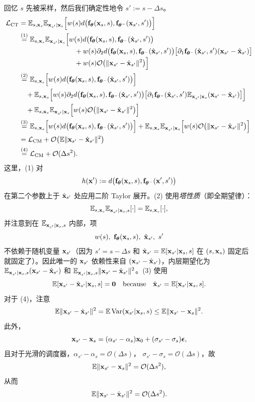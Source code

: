 回忆 $s$ 先被采样，然后我们确定性地令 $s':=s-\Delta s$。
\begin{align*}
\mathcal{L}_{\mathrm{CT}}
&= \mathbb{E}_{s,{\mathbf{x}}_s}\mathbb{E}_{{\mathbf{x}}_{s'}|{\mathbf{x}}_s} \Big[w(s) d\big({\mathbf{f}}_{{\bm{\theta}}}({\mathbf{x}}_s,s), {\mathbf{f}}_{{\bm{\theta}}^-}({\mathbf{x}}_{s'},s')\big)\Big]
\\
&\overset{\text{(1)}}{=} \mathbb{E}_{s,{\mathbf{x}}_s}\mathbb{E}_{{\mathbf{x}}_{s'}|{\mathbf{x}}_s} \Big[
w(s) d\big({\mathbf{f}}_{{\bm{\theta}}}({\mathbf{x}}_s,s), {\mathbf{f}}_{{\bm{\theta}}^-}(\hat{{\mathbf{x}}}_{s'},s')\big)
\\[-2pt]
&\qquad\qquad\qquad\qquad
+ w(s) \partial_2 d\big({\mathbf{f}}_{{\bm{\theta}}}({\mathbf{x}}_s,s),{\mathbf{f}}_{{\bm{\theta}}^-}(\hat{{\mathbf{x}}}_{s'},s')\big)\big[\partial_1{\mathbf{f}}_{{\bm{\theta}}^-}(\hat{{\mathbf{x}}}_{s'},s')({\mathbf{x}}_{s'}-\hat{{\mathbf{x}}}_{s'})\big]
\\[-2pt]
&\qquad\qquad\qquad\qquad
+ w(s) \mathcal O \big(\|{\mathbf{x}}_{s'}-\hat{{\mathbf{x}}}_{s'}\|^2\big)\Big]
\\
&\overset{\text{(2)}}{=} \mathbb{E}_{s,{\mathbf{x}}_s} \Big[w(s) d\big({\mathbf{f}}_{{\bm{\theta}}}({\mathbf{x}}_s,s), {\mathbf{f}}_{{\bm{\theta}}^-}(\hat{{\mathbf{x}}}_{s'},s')\big)\Big]
\\
&\quad+ \mathbb{E}_{s,{\mathbf{x}}_s} \Big[w(s) \partial_2 d\big({\mathbf{f}}_{{\bm{\theta}}}({\mathbf{x}}_s,s),{\mathbf{f}}_{{\bm{\theta}}^-}(\hat{{\mathbf{x}}}_{s'},s')\big)\big[\partial_1{\mathbf{f}}_{{\bm{\theta}}^-}(\hat{{\mathbf{x}}}_{s'},s') \mathbb{E}_{{\mathbf{x}}_{s'}|{\mathbf{x}}_s}({\mathbf{x}}_{s'}-\hat{{\mathbf{x}}}_{s'})\big]\Big]
\\
&\quad+ \mathbb{E}_{s,{\mathbf{x}}_s}\mathbb{E}_{{\mathbf{x}}_{s'}|{\mathbf{x}}_s} \Big[w(s) \mathcal{O} \big(\|{\mathbf{x}}_{s'}-\hat{{\mathbf{x}}}_{s'}\|^2\big)\Big]
\\
&\overset{\text{(3)}}{=} \mathbb{E}_{s,{\mathbf{x}}_s} \Big[w(s) d\big({\mathbf{f}}_{{\bm{\theta}}}({\mathbf{x}}_s,s), {\mathbf{f}}_{{\bm{\theta}}^-}(\hat{{\mathbf{x}}}_{s'},s')\big)\Big]
+ \mathbb{E}_{s,{\mathbf{x}}_s}\mathbb{E}_{{\mathbf{x}}_{s'}|{\mathbf{x}}_s} \Big[w(s) \mathcal{O} \big(\|{\mathbf{x}}_{s'}-\hat{{\mathbf{x}}}_{s'}\|^2\big)\Big]
\\
&= \mathcal{L}_{\mathrm{CM}} 
+ \mathcal{O} \big(\mathbb{E}\|{\mathbf{x}}_{s'}-\hat{{\mathbf{x}}}_{s'}\|^2\big)
\\
&\overset{\text{(4)}}{=} \mathcal{L}_{\mathrm{CM}} + \mathcal{O}(\Delta s^2).
\end{align*}
这里，(1) 对
\[
h({\mathbf{x}}') := d\big({\mathbf{f}}_{{\bm{\theta}}}({\mathbf{x}}_s,s), {\mathbf{f}}_{{\bm{\theta}}^-}({\mathbf{x}}',s')\big)
\]
在第二个参数上于 $\hat{{\mathbf{x}}}_{s'}$ 处应用二阶 Taylor 展开。(2) 使用\textit{塔性质}（即全期望律）：
\[
\mathbb{E}_{s,{\mathbf{x}}_s}\mathbb{E}_{{\mathbf{x}}_{s'}|{\mathbf{x}}_s,s}[\cdot]
=\mathbb{E}_{s,{\mathbf{x}}_s}[\cdot],
\]
并注意到在 $\mathbb{E}_{{\mathbf{x}}_{s'}|{\mathbf{x}}_s,s}$ 内部，项
\[
w(s),\ \rvf_{\btheta}(\rvx_s,s),\ \hat\rvx_{s'},\ s'
\]
不依赖于随机变量 ${\mathbf{x}}_{s'}$（因为 $s' = s-\Delta s$ 和 $\hat{{\mathbf{x}}}_{s'}=\mathbb{E}[{\mathbf{x}}_{s'}|{\mathbf{x}}_s,s]$ 在 $(s,{\mathbf{x}}_s)$ 固定后就固定了）。因此唯一的 ${\mathbf{x}}_{s'}$ 依赖性来自 $({\mathbf{x}}_{s'}-\hat{{\mathbf{x}}}_{s'})$，内层期望化为
$\mathbb{E}_{{\mathbf{x}}_{s'}|{\mathbf{x}}_s,s}({\mathbf{x}}_{s'}-\hat{{\mathbf{x}}}_{s'})$ 和
$\mathbb{E}_{{\mathbf{x}}_{s'}|{\mathbf{x}}_s,s}\|{\mathbf{x}}_{s'}-\hat{{\mathbf{x}}}_{s'}\|^2$。(3) 使用
\[
\mathbb{E}[{\mathbf{x}}_{s'}-\hat{{\mathbf{x}}}_{s'}|{\mathbf{x}}_s,s]=\bm 0
\quad\text{because}\quad
\hat{{\mathbf{x}}}_{s'}=\mathbb{E}[{\mathbf{x}}_{s'}|{\mathbf{x}}_s,s].
\]
对于 (4)，注意
\[
\mathbb{E}\|{\mathbf{x}}_{s'}-\hat{{\mathbf{x}}}_{s'}\|^2
=\mathbb{E}\,\mathrm{Var}({\mathbf{x}}_{s'}|{\mathbf{x}}_s,s)
\le \mathbb{E}\|{\mathbf{x}}_{s'}-{\mathbf{x}}_s\|^2.
\]
此外，
\[
{\mathbf{x}}_{s'}-{\mathbf{x}}_s=(\alpha_{s'}-\alpha_s){\mathbf{x}}_0+(\sigma_{s'}-\sigma_s){\bm{\epsilon}},
\]
且对于光滑的调度器，$\alpha_{s'}-\alpha_s=\mathcal{O}(\Delta s)$，
$\sigma_{s'}-\sigma_s=\mathcal{O}(\Delta s)$，故
\[
\mathbb{E}\|{\mathbf{x}}_{s'}-{\mathbf{x}}_s\|^2=\mathcal{O}(\Delta s^2),
\]
从而
\[
\mathbb{E}\|{\mathbf{x}}_{s'}-\hat{{\mathbf{x}}}_{s'}\|^2=\mathcal{O}(\Delta s^2).
\]


